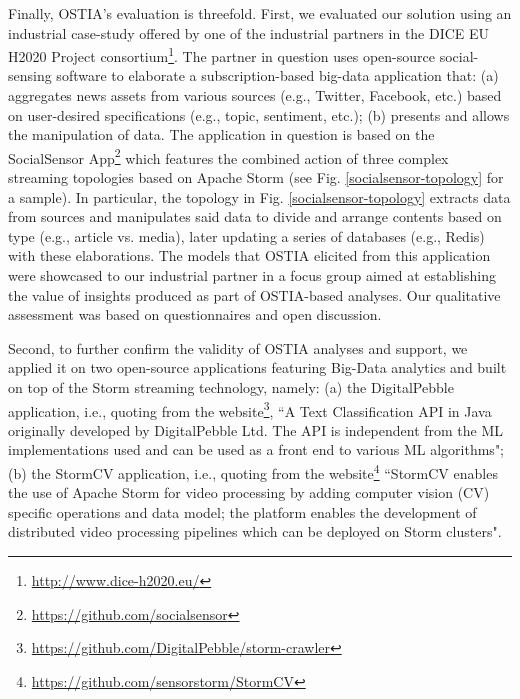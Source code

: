 Finally, OSTIA's evaluation is threefold.  First, we evaluated our solution
using an industrial case-study offered by one of the industrial partners in the
DICE EU H2020 Project consortium\footnote{\url{http://www.dice-h2020.eu/}}.  The
partner in question uses open-source social-sensing software to elaborate a
subscription-based big-data application that: (a) aggregates news assets from
various sources (e.g., Twitter, Facebook, etc.) based on user-desired
specifications (e.g., topic, sentiment, etc.); (b) presents and allows the
manipulation of data. The application in question is based on the SocialSensor
App\footnote{\url{https://github.com/socialsensor}} which features the combined
action of three complex streaming topologies based on Apache Storm (see
Fig. \ref{socialsensor-topology} for a sample).  In particular, the topology in
Fig. \ref{socialsensor-topology} extracts data from sources and manipulates said
data to divide and arrange contents based on type (e.g., article vs. media),
later updating a series of databases (e.g., Redis) with these elaborations. The
models that OSTIA elicited from this application were showcased to our
industrial partner in a focus group aimed at establishing the value of insights
produced as part of OSTIA-based analyses. Our qualitative assessment was based
on questionnaires and open discussion.

Second, to further confirm the validity of OSTIA analyses and support, we
applied it on two open-source applications featuring Big-Data analytics and
built on top of the Storm streaming technology, namely: (a) the DigitalPebble
application, i.e., quoting from the
website\footnote{\url{https://github.com/DigitalPebble/storm-crawler}}, ``A
Text Classification API in Java originally developed by DigitalPebble Ltd. The
API is independent from the ML implementations used and can be used as a front
end to various ML algorithms"; (b) the StormCV application, i.e., quoting from
the website\footnote{\url{https://github.com/sensorstorm/StormCV}} ``StormCV
enables the use of Apache Storm for video processing by adding computer vision
(CV) specific operations and data model; the platform enables the development of
distributed video processing pipelines which can be deployed on Storm clusters".


